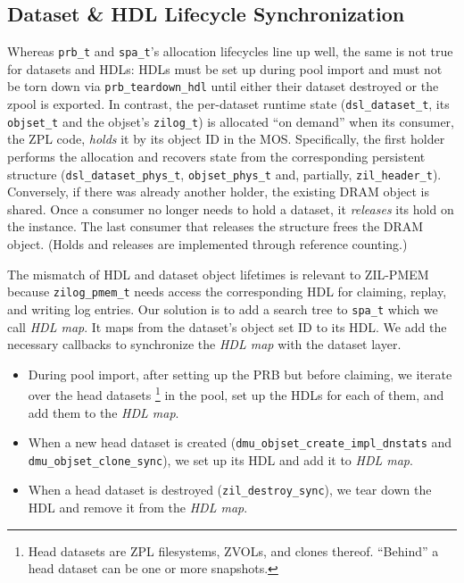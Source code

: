 \documentclass[12pt,a4paper,twoside]{book}
\begin{document}
\subsection{Dataset \& HDL Lifecycle Synchronization}\label{sec:zilpmem:hdllifecycle}
Whereas \lstinline{prb_t} and \lstinline{spa_t}'s allocation lifecycles line up well, the same is not true for datasets and HDLs:
HDLs must be set up during pool import and must not be torn down via \lstinline{prb_teardown_hdl} until either their dataset destroyed or the zpool is exported.
In contrast, the per-dataset runtime state (\lstinline{dsl_dataset_t}, its \lstinline{objset_t} and the objset's \lstinline{zilog_t}) is allocated ``on demand'' when its consumer, the ZPL code, \textit{holds} it by its object ID in the MOS.
Specifically, the first holder performs the allocation and recovers state from the corresponding persistent structure (\lstinline{dsl_dataset_phys_t}, \lstinline{objset_phys_t} and, partially, \lstinline{zil_header_t}).
Conversely, if there was already another holder, the existing DRAM object is shared.
Once a consumer no longer needs to hold a dataset, it \textit{releases} its hold on the instance.
The last consumer that releases the structure frees the DRAM object.
(Holds and releases are implemented through reference counting.)

The mismatch of HDL and dataset object lifetimes is relevant to ZIL-PMEM because \lstinline{zilog_pmem_t} needs access the corresponding HDL for claiming, replay, and writing log entries.
Our solution is to add a search tree to \lstinline{spa_t} which we call \textit{HDL map}.
It maps from the dataset's object set ID to its HDL.
We add the necessary callbacks to synchronize the \textit{HDL map} with the dataset layer.
\begin{itemize}[noitemsep]
    \item During pool import, after setting up the PRB but before claiming, we iterate over the head datasets%
        \footnote{Head datasets are ZPL filesystems, ZVOLs, and clones thereof. ``Behind'' a head dataset can be one or more snapshots.}
        in the pool, set up the HDLs for each of them, and add them to the \textit{HDL map}.
    \item When a new head dataset is created (\lstinline{dmu_objset_create_impl_dnstats} and \lstinline{dmu_objset_clone_sync}), we set up its HDL and add it to \textit{HDL map}.
    \item When a head dataset is destroyed (\lstinline{zil_destroy_sync}), we tear down the HDL and remove it from the \textit{HDL map}.
\end{itemize}
\end{document}
